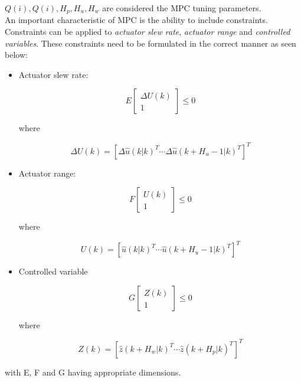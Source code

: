 $Q(i), Q(i), H_p, H_u, H_w$ are considered the MPC tuning parameters.\\

An important characteristic of MPC is the ability to include constraints. Constraints can be applied to \textit{actuator slew rate}, \textit{actuator range} and \textit{controlled variables}. These constraints need to be formulated in the correct manner as seen below:

\begin{itemize}
	\item Actuator slew rate:

	\begin{equation} \label{eq:mpc_const_sr}
		E \begin{bmatrix} \Delta U(k) \\ 1 \end{bmatrix} \le 0
	\end{equation}
	\begin{center} where \end{center}
	\begin{equation*}
		\Delta U(k) = [\Delta \hat{u}(k|k)^T \cdots \Delta \hat{u}(k+H_u-1|k)^T]^T
	\end{equation*}


	\item Actuator range:

	\begin{equation} \label{eq:mpc_const_ar}
		F \begin{bmatrix} U(k) \\ 1 \end{bmatrix} \le 0
	\end{equation}
	\begin{center} where \end{center}
	\begin{equation*}
		U(k) = [\hat{u}(k|k)^T \cdots \hat{u}(k+H_u-1|k)^T]^T
	\end{equation*}

	\item Controlled variable

	\begin{equation} \label{eq:mpc_const_cv}
		G \begin{bmatrix} Z(k) \\ 1 \end{bmatrix} \le 0
	\end{equation}
	\begin{center} where \end{center}
	\begin{equation*}
		Z(k) = [\hat{z}(k+H_w|k)^T \cdots \hat{z}(k+H_p|k)^T]^T
	\end{equation*}
\end{itemize}

\noindent with E, F and G having appropriate dimensions.







